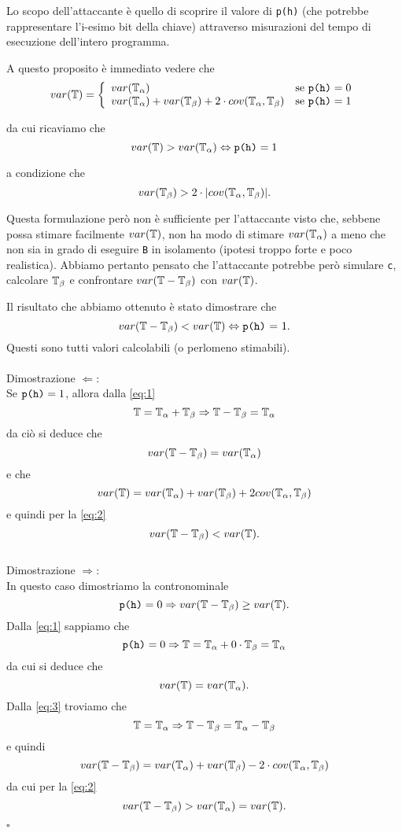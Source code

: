 	Lo scopo dell'attaccante è quello di scoprire il valore di \texttt{p(h)} (che potrebbe rappresentare l'i-esimo bit della chiave) attraverso misurazioni del tempo di esecuzione dell'intero programma.
	
	A questo proposito è immediato vedere che $$var(\mathbb{T})=\left\{\begin{array}{ll}
	var(\mathbb{T}_{\alpha}) & \mathrm{s}\mathrm{e}\ \text{\texttt{p(h)}} = 0\\
	var(\mathbb{T}_{\alpha})+var(\mathbb{T}_{\beta})+2\cdot cov (\mathbb{T}_{\alpha},\mathbb{T}_{\beta}) & \mathrm{s}\mathrm{e}\ \text{\texttt{p(h)}} = 1
	\end{array}\right.$$ 
	
	da cui ricaviamo che $$var(\mathbb{T}) > var(\mathbb{T}_{\alpha}) \Leftrightarrow \text{\texttt{p(h)}} = 1$$ 
	
	a condizione che 
	\begin{equation} \label{eq:2}
		var(\mathbb{T}_{\beta}) > 2 \cdot |cov(\mathbb{T}_{\alpha},\mathbb{T}_{\beta})|.
	\end{equation}
		
	Questa formulazione però non è sufficiente per l'attaccante visto che, sebbene possa stimare facilmente $var(\mathbb{T})$, non ha modo di stimare $var(\mathbb{T}_{\alpha})$ a meno che non sia in grado di eseguire \texttt{B} in isolamento (ipotesi troppo forte e poco realistica). Abbiamo pertanto pensato che l'attaccante potrebbe però simulare \texttt{c}, calcolare $\mathbb{T}_{\beta}$ e confrontare $var(\mathbb{T} - \mathbb{T}_{\beta})$ con $var(\mathbb{T})$. 
	
	Il risultato che abbiamo ottenuto è stato dimostrare che $$var(\mathbb{T} - \mathbb{T}_{\beta}) < var(\mathbb{T}) \Leftrightarrow \text{\texttt{p(h)} = 1}.$$ Questi sono tutti valori calcolabili (o perlomeno stimabili).\\ \\Dimostrazione $\Leftarrow$:\\
	Se $\text{\texttt{p(h)}} = 1$, allora dalla \ref{eq:1} $$\mathbb{T} = \mathbb{T}_{\alpha} + \mathbb{T}_{\beta} \Rightarrow \mathbb{T} - \mathbb{T}_{\beta} = \mathbb{T}_{\alpha}$$
	da ciò si deduce che $$var(\mathbb{T} - \mathbb{T}_{\beta}) = var(\mathbb{T}_{\alpha})$$ 
	e che $$var(\mathbb{T}) = var(\mathbb{T}_{\alpha}) + var(\mathbb{T}_{\beta}) + 2cov(\mathbb{T}_{\alpha},\mathbb{T}_{\beta})$$
	e quindi per la \ref{eq:2} $$var(\mathbb{T} - \mathbb{T}_{\beta}) < var(\mathbb{T}).$$\\Dimostrazione $\Rightarrow$:\\
	In questo caso dimostriamo la contronominale $$\text{\texttt{p(h)}} = 0 \Rightarrow var(\mathbb{T} - \mathbb{T}_{\beta}) \geq var(\mathbb{T}).$$  
	Dalla \ref{eq:1} sappiamo che
	\begin{equation} \label{eq:3}
		\text{\texttt{p(h)}} = 0 \Rightarrow \mathbb{T} = \mathbb{T}_{\alpha} + 0\cdot \mathbb{T}_{\beta} = \mathbb{T}_{\alpha}
	\end{equation}
	da cui si deduce che $$var(\mathbb{T}) = var(\mathbb{T}_{\alpha}).$$
	Dalla \ref{eq:3} troviamo che
	$$\mathbb{T} = \mathbb{T}_{\alpha} \Rightarrow \mathbb{T} - \mathbb{T}_{\beta} = \mathbb{T}_{\alpha} - \mathbb{T}_{\beta}$$
	e quindi
	$$var(\mathbb{T} - \mathbb{T}_{\beta}) = var(\mathbb{T}_{\alpha}) + var(\mathbb{T}_{\beta}) - 2\cdot cov (\mathbb{T}_{\alpha},\mathbb{T}_{\beta})$$
	da cui per la \ref{eq:2}
	$$var(\mathbb{T} - \mathbb{T}_{\beta}) > var(\mathbb{T}_{\alpha}) = var(\mathbb{T}).$$
	\begin{flushright}
		$\square$
	\end{flushright}

